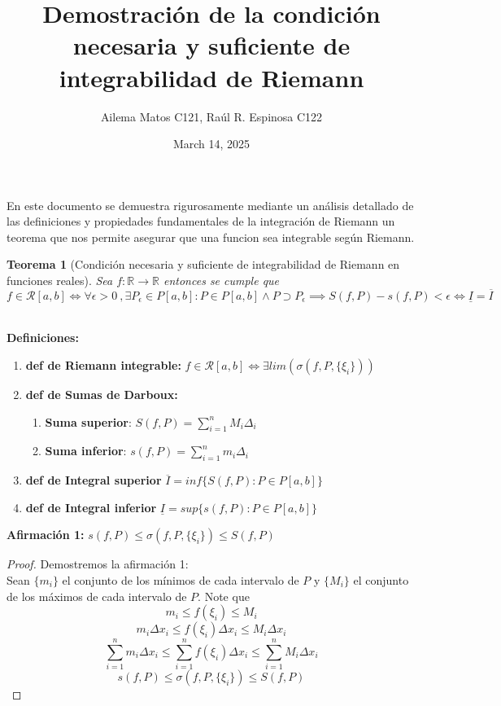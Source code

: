 \documentclass{article}
\title{Demostración de la condición necesaria y suficiente de integrabilidad de Riemann}
\author{
Ailema Matos C121,
Raúl R. Espinosa C122 
}
\date{March 14, 2025}
\newtheorem{theorem}{Teorema}
\begin{document}
\maketitle

\section*{}

En este documento se demuestra rigurosamente mediante un análisis detallado de las definiciones y propiedades fundamentales de la integración de Riemann 
un teorema que nos permite asegurar que una funcion sea integrable según Riemann.\\

\begin{theorem}[Condición necesaria y suficiente de integrabilidad de Riemann en funciones reales]
Sea \( f: \mathbb{R} \to \mathbb{R} \) entonces se cumple que 
\[f \in \mathcal{R}[a, b] \Longleftrightarrow \forall \epsilon>0\ ,  \exists P_\epsilon \in P[a, b]: P \in P[a, b] \wedge P \supset P_\epsilon \implies S(f, P) - s(f, P) < \epsilon \Longleftrightarrow \underline{I} = \overline{I}\]\\
\end{theorem}

\textbf{Definiciones:}

\begin{enumerate}
   \item \textbf{def de Riemann integrable:} \(f \in \mathcal{R}[a, b] \Longleftrightarrow   \exists lim(\sigma(f, P,\{\xi_i\}))\)
    \item \textbf{def de Sumas de Darboux:} 
\begin{enumerate}
	\item \textbf{Suma superior}: \(S(f, P) = \sum_{i = 1}^{n} M_i\Delta_i\)
           \item \textbf{Suma inferior}: \(s(f,P) =\sum_{i = 1}^{n}m_i\Delta_i\)
\end{enumerate}
    \item \textbf{def de Integral superior}  \(\overline{I} = inf \{ S(f, P): P \in P[a, b] \} \)  
    \item \textbf{def de Integral inferior}  \(\underline{I} = sup\{ s(f, P): P \in P[a, b] \} \)
\end{enumerate} 
\textbf{Afirmación 1:} \(s(f, P) \leq \sigma(f, P,\{\xi_i\}) \leq S(f, P)\)

\begin{proof}
Demostremos la afirmación 1:\\

Sean \(\{m_i\}\) el conjunto de los mínimos de cada intervalo de \(P\) y \(\{M_i\}\) el conjunto de los máximos de cada intervalo de \(P\).
Note que 
\[
m_i \leq f(\xi_i) \leq M_i
\]
\[
m_i \Delta x_i \leq f(\xi_i)\Delta x_i \leq M_i\Delta x_i
\] 
\[
\sum_{i = 1}^{n} m_i \Delta x_i \leq \sum_{i = 1}^{n} f(\xi_i)\Delta x_i \leq \sum_{i = 1}^{n} M_i\Delta x_i
\]
\[
s(f, P) \leq \sigma(f, P,\{\xi_i\}) \leq S(f, P)
\]
\end{proof}
\end{document}
